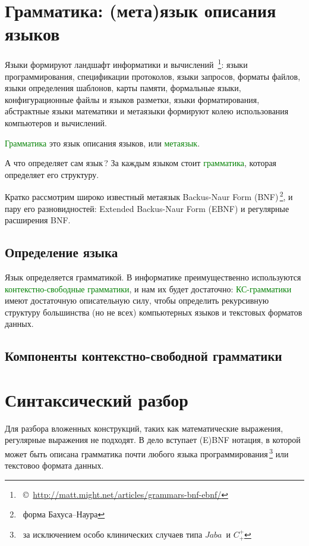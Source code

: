 \documentclass[oneside,10pt]{article}
\newcommand{\note}[1]{\,\footnote{\ #1}}
\newcommand{\cp}[1]{\note{\copyright\ #1}}
\newcommand{\term}[1]{\textcolor{green}{#1}}
\newcommand{\cpp}{$C^+_+$}
\newcommand{\java}{$Jaba$}
\begin{document}
\clearpage
\section{Грамматика: (мета)язык описания языков}\label{grammar}

Языки формируют ландшафт информатики и вычислений
\cp{\url{http://matt.might.net/articles/grammars-bnf-ebnf/}}:
языки программирования, спецификации протоколов, языки запросов, форматы файлов,
языки определения шаблонов, карты памяти, формальные языки, конфигурационные
файлы и языков разметки, языки форматирования, абстрактные языки математики и
метаязыки формируют колею использования компьютеров и вычислений.
\begin{framed}
\term{Грамматика} это язык описания языков, или \term{метаязык}.
\end{framed}
А что определяет сам язык\,?
За каждым языком стоит \term{грамматика}, которая определяет его структуру.

\noindent
Кратко рассмотрим широко известный метаязык Backus-Naur Form
(BNF)\note{форма Бахуса--Наура}, и пару его разновидностей: Extended
Backus-Naur Form (EBNF) и регулярные расширения BNF.

\subsection{Определение языка}

Язык определяется грамматикой. В информатике преимущественно используются
\term{контекстно-свободные грамматики}, и нам их будет достаточно:
\term{КС-грамматики} имеют достаточную описательную силу, чтобы определить
рекурсивную структуру большинства (но не всех) компьютерных языков и текстовых
форматов данных.

\subsection{Компоненты контекстно-свободной грамматики}

\clearpage
\section{Синтаксический разбор}

Для разбора вложенных конструкций, таких как математические выражения,
регулярные выражения не подходят. В дело вступает (E)BNF нотация, в которой
может быть описана грамматика почти любого языка программирования\note{за
исключением особо клинических случаев типа \java\ и \cpp} или текстовоо формата
данных.
\end{document}
